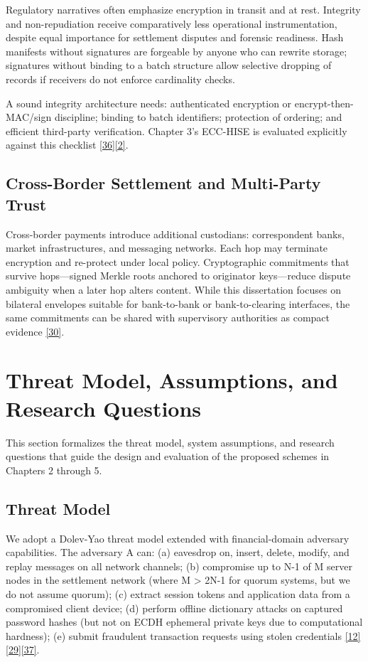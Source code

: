 \indent Regulatory narratives often emphasize encryption in transit and at rest. Integrity and non-repudiation receive comparatively less operational instrumentation, despite equal importance for settlement disputes and forensic readiness. Hash manifests without signatures are forgeable by anyone who can rewrite storage; signatures without binding to a batch structure allow selective dropping of records if receivers do not enforce cardinality checks.

\indent A sound integrity architecture needs: authenticated encryption or encrypt-then-MAC/sign discipline; binding to batch identifiers; protection of ordering; and efficient third-party verification. Chapter 3's ECC-HISE is evaluated explicitly against this checklist \hyperref[ref:36]{[36]}\hyperref[ref:2]{[2]}.

\subsection{Cross-Border Settlement and Multi-Party Trust}

\indent Cross-border payments introduce additional custodians: correspondent banks, market infrastructures, and messaging networks. Each hop may terminate encryption and re-protect under local policy. Cryptographic commitments that survive hops---signed Merkle roots anchored to originator keys---reduce dispute ambiguity when a later hop alters content. While this dissertation focuses on bilateral envelopes suitable for bank-to-bank or bank-to-clearing interfaces, the same commitments can be shared with supervisory authorities as compact evidence \hyperref[ref:30]{[30]}.

\section{Threat Model, Assumptions, and Research Questions}

\indent This section formalizes the threat model, system assumptions, and research questions that guide the design and evaluation of the proposed schemes in Chapters 2 through 5.

\subsection{Threat Model}

\indent We adopt a Dolev-Yao threat model extended with financial-domain adversary capabilities. The adversary A can: (a) eavesdrop on, insert, delete, modify, and replay messages on all network channels; (b) compromise up to N-1 of M server nodes in the settlement network (where M > 2N-1 for quorum systems, but we do not assume quorum); (c) extract session tokens and application data from a compromised client device; (d) perform offline dictionary attacks on captured password hashes (but not on ECDH ephemeral private keys due to computational hardness); (e) submit fraudulent transaction requests using stolen credentials \hyperref[ref:12]{[12]}\hyperref[ref:29]{[29]}\hyperref[ref:37]{[37]}.

